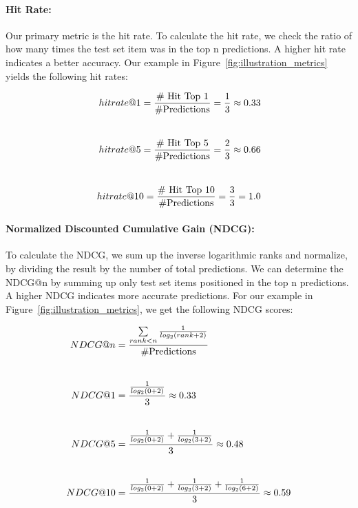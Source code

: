 \paragraph{Hit Rate:}
Our primary metric is the hit rate. To calculate the hit rate, we check the ratio of how many times the test set item was in the top n predictions. A higher hit rate indicates a better accuracy. Our example in Figure~\ref{fig:illustration_metrics} yields the following hit rates:

\begin{equation}
\setlength{\jot}{25pt}
    \begin{aligned}
        hit rate @1=\frac{\text{\# Hit Top 1}}{\text{\#Predictions}}=\frac{1}{3}\approx0.33 \\
        hit rate @5=\frac{\text{\# Hit Top 5}}{\text{\#Predictions}}=\frac{2}{3} \approx 0.66\\
        hit rate @10=\frac{\text{\# Hit Top 10}}{\text{\#Predictions}}=\frac{3}{3}=1.0 
    \end{aligned}
    \label{equation:hit_rate}
\end{equation}

\paragraph{Normalized Discounted Cumulative Gain (NDCG):}
To calculate the NDCG, we sum up the inverse logarithmic ranks and normalize, by dividing the result by the number of total predictions. We can determine the NDCG@n by summing up only test set items positioned in the top n predictions. A higher NDCG indicates more accurate predictions. For our example in Figure~\ref{fig:illustration_metrics}, we get the following NDCG scores:

\begin{equation}
\setlength{\jot}{25pt}
    \begin{aligned}
        NDCG@n&=\frac{ \sum\limits_{rank<n}
      \frac{1}{log_2(rank + 2)}}
      {\text{\#Predictions}} \\
        NDCG@1&=\frac{\frac{1}{log_2(0 + 2)}}{3}\approx 0.33 \\
        NDCG@5&=\frac{\frac{1}{log_2(0 + 2)}+\frac{1}{log_2(3+2)}}{3}\approx 0.48 \\
        NDCG@10&=\frac{\frac{1}{log_2(0 + 2)}+\frac{1}{log_2(3+2)}+\frac{1}{log_2(6+2)}}{3}\approx 0.59
    \end{aligned}
    \label{equation:NDCG}
\end{equation}


